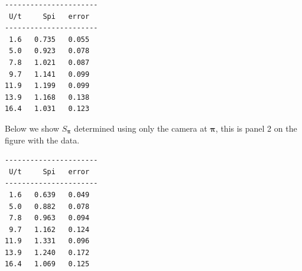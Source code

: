 \documentclass[11pt,letter]{article}
\newcommand{\bv}[1]{\ensuremath{\bm{#1}}}
\begin{document}
\begin{verbatim}
----------------------
 U/t     Spi   error
----------------------
 1.6   0.735   0.055
 5.0   0.923   0.078
 7.8   1.021   0.087
 9.7   1.141   0.099
11.9   1.199   0.099
13.9   1.168   0.138
16.4   1.031   0.123
\end{verbatim}

\vspace{2em}
\newpage

Below we show $S_{\bv{\pi}}$ determined using only the camera at $\bv{\pi}$, this is panel 2 on the figure with the data.   

\begin{verbatim}
----------------------
 U/t     Spi   error
----------------------
 1.6   0.639   0.049
 5.0   0.882   0.078
 7.8   0.963   0.094
 9.7   1.162   0.124
11.9   1.331   0.096
13.9   1.240   0.172
16.4   1.069   0.125
\end{verbatim}
 



\newpage 
\end{document}
